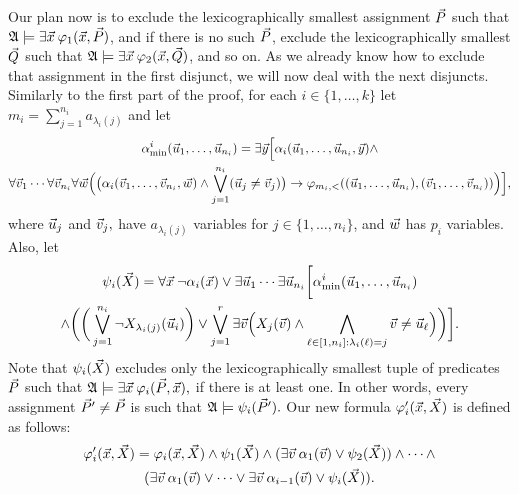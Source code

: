 Our plan now is to exclude the lexicographically smallest assignment $\P$ such that $\A\models\exists\x\:\varphi_1(\x,\P)$, and if there is no such $\P$, exclude the lexicographically smallest $\Q$ such that $\A\models\exists\x\:\varphi_2(\x,\Q)$, and so on. As we already know how to exclude that assignment in the first disjunct, we will now deal with the next disjuncts. Similarly to the first part of the proof, for each $i\in\{1,\ldots,k\}$ let $m_i = \sum_{j = 1}^{n_i} a_{\lambda_i(j)}$ and let
\begin{multline*}
\alpha^i_{\min}(\u_1,\dots,\u_{n_i}) = \exists\y\Big[ \alpha_i(\u_1,\dots,\u_{n_i},\y)\wedge \\ \forall\v_1\cdots\forall\v_{n_i}\forall\w\Big(\big(\alpha_i(\v_1,\dots,\v_{n_i},\w)\wedge\bigvee_{j=1}^{n_i}(\u_j\neq\v_j)\big)\to \varphi_{m_i,<}((\u_1,\dots,\u_{n_i}),(\v_1,\dots,\v_{n_i}))\Big)\Big],
\end{multline*}
where $\u_j$ and $\v_j,$ have $a_{\lambda_i(j)}$ variables for $j\in\{1,\ldots,n_i\}$, and $\w$ has $p_i$ variables. Also, let
\begin{multline*}
\psi_i(\X) = \forall\x\:\neg\alpha_i(\x) \vee \exists\u_1\cdots\exists\u_{n_i}\bigg[\alpha^i_{\min}(\u_1,\dots,\u_{n_i}) \\ \wedge \bigg(\bigg(\bigvee_{j = 1}^{n_i}\neg X_{\lambda_i(j)}(\u_i) \bigg) \vee \bigvee_{j=1}^r \exists \v\Big( X_j(\v) \wedge \bigwedge_{\ell\in[1,n_i]: \lambda_i(\ell) = j} \v \neq \u_\ell\Big) \bigg) \bigg].
\end{multline*}
Note that $\psi_i(\X)$ excludes only the lexicographically smallest tuple of predicates $\P$ such that $\A\models\exists\x\:\varphi_i(\P,\x),$ if there is at least one. In other words, every assignment $\P^\prime \neq \P$ is such that $\A\models\psi_i(\P^\prime).$ Our new formula $\varphi_i^\prime(\x,\X)$ is defined as follows:
\begin{multline}
\varphi_i^\prime(\x,\X) = \varphi_i(\x,\X) \wedge \psi_1(\X) \wedge (\exists\v\:\alpha_1(\v)\vee\psi_2(\X)) \wedge \cdots \wedge \\ (\exists\v\:\alpha_1(\v)\vee\cdots\vee\exists\v\:\alpha_{i-1}(\v)\vee\psi_i(\X)).
\end{multline}